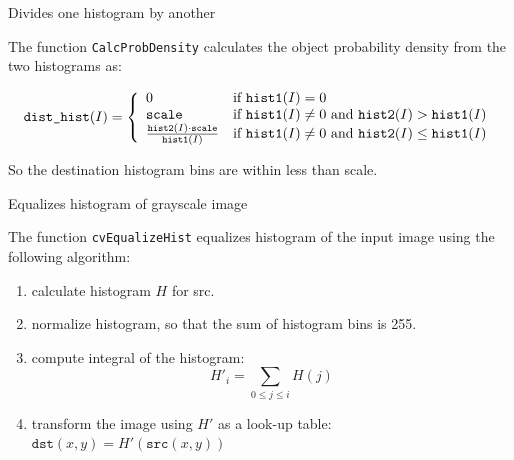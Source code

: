 \label{CalcProbDensity}

Divides one histogram by another


\begin{description}
\end{description}

The function \texttt{CalcProbDensity} calculates the object probability density from the two histograms as:

\[
\texttt{dist\_hist}(I)=
\left\{ \begin{array}{l l} 0 & \mbox{if $\texttt{hist1}(I)=0$}\\ \texttt{scale} & \mbox{if $\texttt{hist1}(I) \ne 0$ and $\texttt{hist2}(I) > \texttt{hist1}(I)$}\\ \frac{\texttt{hist2}(I) \cdot \texttt{scale}}{\texttt{hist1}(I)} & \mbox{if $\texttt{hist1}(I) \ne 0$ and $\texttt{hist2}(I) \le \texttt{hist1}(I)$}\\ \end{array} \right.
\]

So the destination histogram bins are within less than scale.

\label{EqualizeHist}

Equalizes histogram of grayscale image


\begin{description}
\end{description}

The function \texttt{cvEqualizeHist} equalizes histogram of the input image using the following algorithm:

\begin{enumerate}
\item calculate histogram $H$ for src.
\item normalize histogram, so that the sum of histogram bins is 255.
\item compute integral of the histogram:
\[
H'_i = \sum_{0 \le j \le i} H(j)
\]
\item transform the image using $H'$ as a look-up table: $\texttt{dst}(x,y) = H'(\texttt{src}(x,y))$
\end{enumerate}

